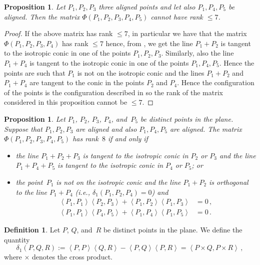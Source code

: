 \documentclass[12pt, a4paper, reqno, captions=tableheading,bibliography=totoc]{scrartcl}
\theoremstyle{plain}
\newtheorem{prop}[lemma]{Proposition}
\theoremstyle{definition}
\newtheorem{definition}[lemma]{Definition}
\newcommand{\scl}[2]{\left\langle {#1}, {#2} \right\rangle}
\begin{document}
\begin{prop}
  Let $P_1, P_2, P_3$ three aligned points and let also $P_1, P_4, P_5$
  be aligned. Then the matrix $\Phi(P_1, P_2, P_3, P_4, P_5)$ cannot
  have rank $\leq 7$.
\end{prop}
\begin{proof}
  If the above matrix has rank $\leq 7$, in particular we have that
  the matrix $\Phi(P_1, P_2, P_3, P_4)$ has rank $\leq 7$ hence, from
  , we get the line $P_1+P_2$ is
  tangent to the isotropic conic in one of the points $P_1, P_2, P_3$.
  Similarly, also the line $P_1+P_4$ is tangent to the isotropic conic
  in one of the points $P_1, P_4, P_5$. Hence the points are such that
  $P_1$ is not on the isotropic conic and the lines $P_1+P_2$ and
  $P_1+P_4$ are tangent to the conic in the points $P_2$ and $P_4$.
  Hence the configuration of the points is the configuration described
  in  so the rank of the matrix
  considered in this proposition cannot be $\leq 7$.
\end{proof}


\begin{prop}
 Let $P_1$, $P_2$, $P_3$, $P_4$, and~$P_5$ be distinct points in the plane.
 Suppose that $P_1, P_2, P_3$ are aligned and also $P_1, P_4, P_5$ are aligned.
 The matrix $\Phi(P_1, P_2, P_3, P_4, P_5)$ has rank~$8$ if and only if
 \begin{itemize}
  \item the line $P_1 + P_2 + P_3$ is tangent to the isotropic conic in $P_2$ or $P_3$ and the line $P_1 + P_4 + P_5$ is tangent to the isotropic conic in $P_4$ or $P_5$; or
  \item the point~$P_1$ is not on the isotropic conic and the line $P_1 + P_2$ is orthogonal to the line $P_1 + P_4$ (i.e., $\delta_1(P_1, P_2, P_4) = 0$) and
  \begin{align*}
   \scl{P_1}{P_1} \scl{P_2}{P_3} + \scl{P_1}{P_2}\scl{P_1}{P_3} &= 0 \,, \\
   \scl{P_1}{P_1} \scl{P_4}{P_5} + \scl{P_1}{P_4}\scl{P_1}{P_5} &= 0 \,.
  \end{align*}
 \end{itemize}
\end{prop}


\begin{definition}
\label{definition:delta1}
 Let $P$, $Q$, and~$R$ be distinct points in the plane.
 We define the quantity
 \[
  \delta_1(P, Q, R) :=
  \scl{P}{P} \scl{Q}{R} - \scl{P}{Q}\scl{P}{R}
  =
  \scl{P\times Q}{P \times R} \,,
 \]
 where $\times$ denotes the cross product.
\end{definition}
\end{document}
